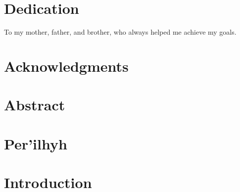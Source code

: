 \documentclass[twoside,11pt]{report}
\begin{document}
	\chapter*{Dedication}
	\setcounter{page}{1}
	To my mother, father, and brother, who always helped me achieve my goals.
	
	\chapter*{Acknowledgments}
	 
	
	\chapter*{Abstract}
	
	
	\chapter*{\foreignlanguage{greek}{Per'ilhyh}}
	
	
	\listoffigures
	\tableofcontents
	
	\chapter{Introduction}
	
	
	
	\printbibliography
	
\end{document}
